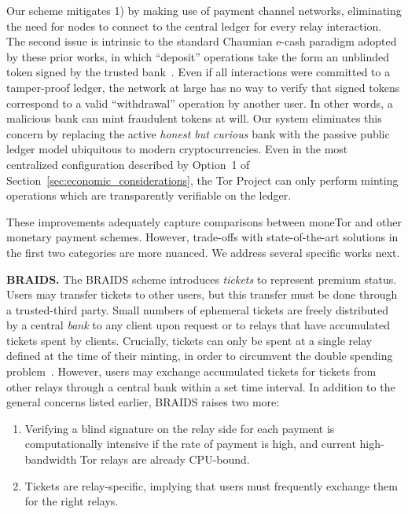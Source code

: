 Our scheme mitigates 1) by making use of payment channel networks, eliminating the need for nodes to connect to the central ledger for every relay interaction.
The second issue is intrinsic to the standard Chaumian e-cash paradigm adopted by these prior works, in which ``deposit'' operations take the form an unblinded token signed by the trusted bank~\cite{chaum1988untraceable}.
Even if all interactions were committed to a tamper-proof ledger, the network at large has no way to verify that signed tokens correspond to a valid ``withdrawal'' operation by another user.
In other words, a malicious bank can mint fraudulent tokens at will.
Our system eliminates this concern by replacing the active \emph{honest but curious} bank with the passive public ledger model ubiquitous to modern cryptocurrencies.
Even in the most centralized configuration described by Option~1 of Section~\ref{sec:economic_considerations}, the Tor Project can only perform minting operations which are transparently verifiable on the ledger.

These improvements adequately capture comparisons between moneTor and other monetary payment schemes.
However, trade-offs with state-of-the-art solutions in the first two categories are more nuanced.
We address several specific works next.

\medskip\noindent\textbf{BRAIDS.}
The BRAIDS scheme introduces \emph{tickets} to represent premium status.
Users may transfer tickets to other users, but this transfer must be done through a trusted-third party.
Small numbers of ephemeral tickets are freely distributed by a central \emph{bank} to any client upon request or to relays that have accumulated tickets spent by clients.
Crucially, tickets can only be spent at a single relay defined at the time of their minting, in order to circumvent the double spending problem~\cite{jansen2010recruiting}.
However, users may exchange accumulated tickets for tickets from other relays through a central bank within a set time interval.
In addition to the general concerns listed earlier, BRAIDS raises two more:

\begin{enumerate}[resume]
\item Verifying a blind signature on the relay side for each payment is computationally intensive if the rate of payment is high, and current high-bandwidth Tor relays are already CPU-bound.
\item Tickets are relay-specific, implying that users must frequently exchange them for the right relays.
\end{enumerate}

